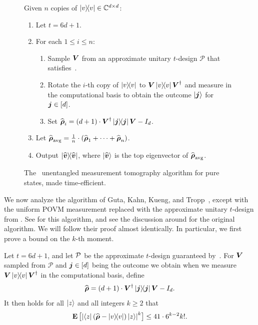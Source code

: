 \documentclass{article}
\begin{document}
{
\begin{figure}[H]
Given $n$ copies of $\ketbra{v} \in \mathbb C^{d \times d}$:
\begin{enumerate}
    \item Let $t = 6d + 1$.
    \item For each $1 \leq i \leq n$:
        \begin{enumerate}
            \item Sample $\boldsymbol{V}$ from an approximate unitary $t$-design $\mathcal{P}$ that satisfies~.
            \item Rotate the $i$-th copy of $\ketbra{v}$ to $\boldsymbol{V}\ketbra{v} \boldsymbol{V}^{\dagger}$ and measure in the computational basis to obtain the outcome $\ket{\boldsymbol{j}}$ for $\boldsymbol{j} \in [d]$.
            \item Set $\widehat{\boldsymbol{\rho}}_i = (d+1) \cdot \boldsymbol{V}^{\dagger} \ketbra{\boldsymbol{j}} \boldsymbol{V} - I_d$.
        \end{enumerate}
    \item Let $\widehat{\boldsymbol{\rho}}_{\mathrm{avg}} = \frac{1}{n} \cdot (\widehat{\boldsymbol{\rho}}_1 + \cdots + \widehat{\boldsymbol{\rho}}_n)$.
    \item Output $\ketbra{\widehat{\boldsymbol{v}}}$, where $\ket{\widehat{\boldsymbol{v}}}$ is the top eigenvector of $\widehat{\boldsymbol{\rho}}_{\mathrm{avg}}$.
\end{enumerate}
\caption{The~\cite{GKKT20} unentangled measurement tomography algorithm for pure states, made time-efficient.}
\label{fig:gkkt-using-t-design}
\end{figure}
}
\noindent

We now analyze the algorithm of Guta, Kahn, Kueng, and Tropp~\cite{GKKT20}, except with the uniform POVM measurement replaced with the approximate unitary $t$-design from .
See  for this algorithm, and see the discussion around  for the original algorithm.
We will follow their proof almost identically.
In particular, we first prove a bound on the $k$-th moment.
\begin{lemma}
    \label{lem:k-th-moment-bound}
    Let $t = 6d+1$, and let $\mathcal{P}$ be the approximate $t$-design guaranteed by~. For $\boldsymbol{V}$ sampled from $\mathcal{P}$ and $\boldsymbol{j} \in [d]$ being the outcome we obtain when we measure $\boldsymbol{V}\ketbra{v} \boldsymbol{V}^{\dagger}$ in the computational basis, define
    \begin{equation*}
        \widehat{\boldsymbol{\rho}} = (d+1)\cdot \boldsymbol{V}^{\dagger} \ketbra{\boldsymbol{j}} \boldsymbol{V} - I_d.
    \end{equation*}
    It then holds for all $\ket{z}$ and all integers $k \geq 2$ that
    \begin{equation}
        \label{eq:our-moment-bound}
        \mathop{\bf E\/}\big[\abs{\bra{z}(\widehat{\boldsymbol{\rho}} - \ketbra{v}) \ket{z}}^k\big] \leq 41 \cdot 6^{k-2}k!.
    \end{equation}
\end{lemma}
\end{document}
